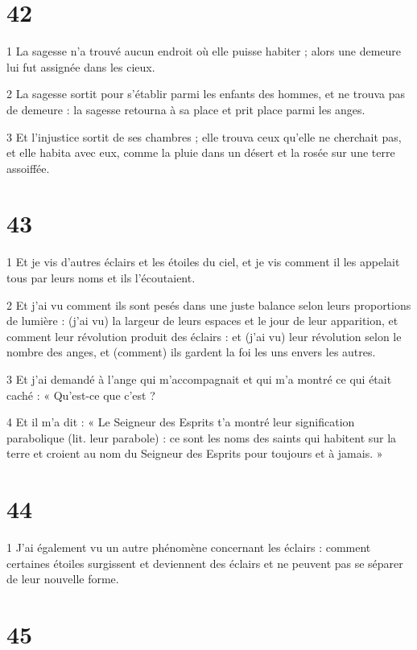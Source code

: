 \chapter{42}

\par 1 La sagesse n'a trouvé aucun endroit où elle puisse habiter ; alors une demeure lui fut assignée dans les cieux.
\par 2 La sagesse sortit pour s'établir parmi les enfants des hommes, et ne trouva pas de demeure : la sagesse retourna à sa place et prit place parmi les anges.
\par 3 Et l'injustice sortit de ses chambres ; elle trouva ceux qu'elle ne cherchait pas, et elle habita avec eux, comme la pluie dans un désert et la rosée sur une terre assoiffée.

\chapter{43}

\par 1 Et je vis d'autres éclairs et les étoiles du ciel, et je vis comment il les appelait tous par leurs noms et ils l'écoutaient.
\par 2 Et j'ai vu comment ils sont pesés dans une juste balance selon leurs proportions de lumière : (j'ai vu) la largeur de leurs espaces et le jour de leur apparition, et comment leur révolution produit des éclairs : et (j'ai vu) leur révolution selon le nombre des anges, et (comment) ils gardent la foi les uns envers les autres.
\par 3 Et j'ai demandé à l'ange qui m'accompagnait et qui m'a montré ce qui était caché : « Qu'est-ce que c'est ?
\par 4 Et il m'a dit : « Le Seigneur des Esprits t'a montré leur signification parabolique (lit. leur parabole) : ce sont les noms des saints qui habitent sur la terre et croient au nom du Seigneur des Esprits pour toujours et à jamais. »

\chapter{44}

\par 1 J'ai également vu un autre phénomène concernant les éclairs : comment certaines étoiles surgissent et deviennent des éclairs et ne peuvent pas se séparer de leur nouvelle forme.

\chapter{45}

